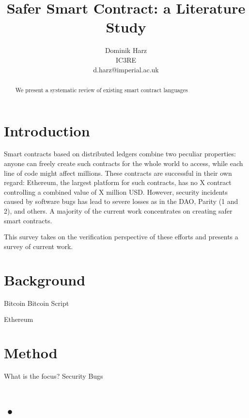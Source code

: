 \documentclass{article}
\title{Safer Smart Contract: a Literature Study}
\date{}
\author{Dominik Harz \\
IC3RE\\
d.harz@imperial.ac.uk}
\begin{document}
\maketitle

\begin{abstract}
We present a systematic review of existing smart contract languages
\end{abstract}

\section{Introduction}
Smart contracts based on distributed ledgers combine two peculiar properties: anyone can freely create such contracts for the whole world to access, while each line of code might affect millions.
These contracts are successful in their own regard:
Ethereum, the largest platform for such contracts, has no X contract controlling a combined value of X million USD.
However, security incidents caused by software bugs has lead to severe losses as in the DAO, Parity (1 and 2), and others.
A majority of the current work concentrates on creating safer smart contracts.

This survey takes on the verification perspective of these efforts and presents a survey of current work.

\section{Background}
Bitcoin \cite{Nakamoto2008}
Bitcoin Script \cite{BitcoinWiki2018Script}

Ethereum \cite{Buterin2013,Wood2014}


\section{Method}
What is the focus?
Security
Bugs

\section{•}



\end{document}
